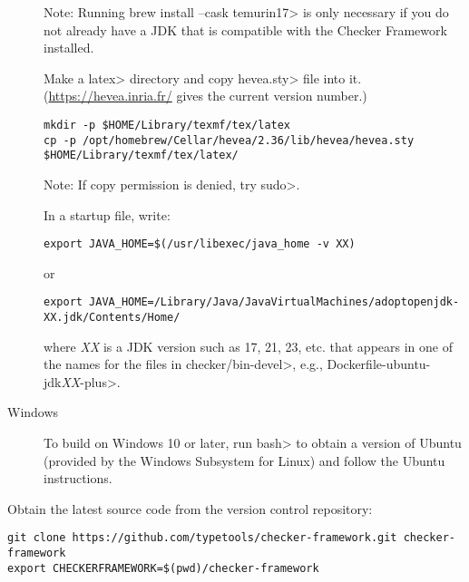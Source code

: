 \begin{description}
Note: Running \<brew install --cask temurin17> is only necessary if you do not
already have a JDK that is compatible with the Checker Framework installed.

Make a \<latex> directory and copy \<hevea.sty> file into it.
(\url{https://hevea.inria.fr/} gives the current version number.)

\begin{Verbatim}
mkdir -p $HOME/Library/texmf/tex/latex
cp -p /opt/homebrew/Cellar/hevea/2.36/lib/hevea/hevea.sty $HOME/Library/texmf/tex/latex/
\end{Verbatim}

Note: If copy permission is denied, try \<sudo>.

In a startup file, write:

\begin{Verbatim}
export JAVA_HOME=$(/usr/libexec/java_home -v XX)
\end{Verbatim}
or
\begin{Verbatim}
export JAVA_HOME=/Library/Java/JavaVirtualMachines/adoptopenjdk-XX.jdk/Contents/Home/
\end{Verbatim}

where \emph{XX} is a JDK version such as 17, 21, 23, etc. that appears in one
of the names for the files in \<checker/bin-devel>, e.g.,
\<Dockerfile-ubuntu-jdk\emph{XX}-plus>.

\item[Windows]
  To build on Windows 10 or later,
  run \<bash> to obtain a version of
  Ubuntu (provided by the Windows Subsystem for Linux) and follow the Ubuntu
  instructions.


\end{description}



Obtain the latest source code from the version control repository:

\begin{Verbatim}
git clone https://github.com/typetools/checker-framework.git checker-framework
export CHECKERFRAMEWORK=$(pwd)/checker-framework
\end{Verbatim}

